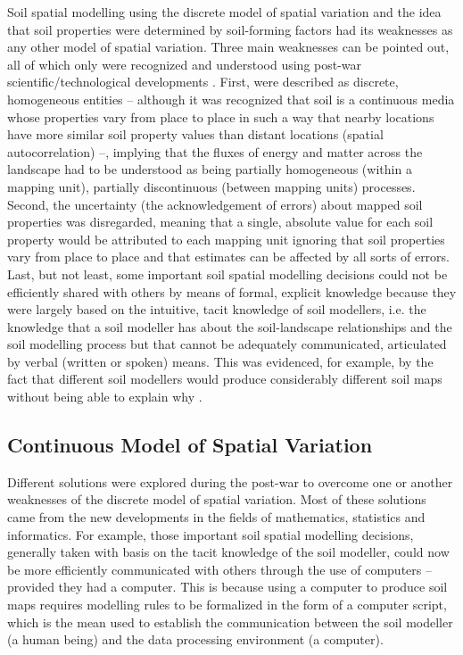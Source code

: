 Soil spatial modelling using the discrete model of spatial variation and the idea that soil properties were 
determined by soil-forming factors had its weaknesses as any other model of spatial variation. Three main 
weaknesses can be pointed out, all of which only were recognized and understood using post-war 
scientific/technological developments \cite{HeuvelinkEtAl2001, McBratneyEtAl2003, ScullEtAl2003}. First, 
 were described as discrete, homogeneous entities -- although it was recognized that soil is a 
continuous media whose properties vary from place to place in such a way that nearby locations have more 
similar soil property values than distant locations (spatial autocorrelation) --, implying that the fluxes of 
energy and matter across the landscape had to be understood as being partially homogeneous (within a mapping 
unit), partially discontinuous (between mapping units) processes. Second, the uncertainty (the 
acknowledgement of errors) about mapped soil properties was disregarded, meaning that a single, absolute value 
for each soil property would be attributed to each mapping unit ignoring that soil properties vary from place 
to place and that estimates can be affected by all sorts of errors. Last, but not least, some important soil 
spatial modelling decisions could not be efficiently shared with others by means of formal, explicit knowledge 
because they were largely based on the intuitive, tacit knowledge of soil modellers, i.e. the knowledge that a 
soil modeller has about the soil-landscape relationships and the soil modelling process but that cannot be 
adequately communicated, articulated by verbal (written or spoken) means. This was evidenced, for example, by 
the fact that different soil modellers would produce considerably different soil maps without being able to 
explain why \cite{Legros2006, BazagliaFilhoEtAl2013}.

\subsection{Continuous Model of Spatial Variation}

Different solutions were explored during the post-war to overcome one or another weaknesses of the discrete 
model of spatial variation. Most of these solutions came from the new developments in the fields of 
mathematics, statistics and informatics. For example, those important soil spatial modelling decisions, 
generally taken with basis on the tacit knowledge of the soil modeller, could now be more efficiently 
communicated with others through the use of computers -- provided they had a computer. This is because using a 
computer to produce soil maps requires modelling rules to be formalized in the form of a computer script, 
which is the mean used to establish the communication between the soil modeller (a human being) and the data 
processing environment (a computer).


